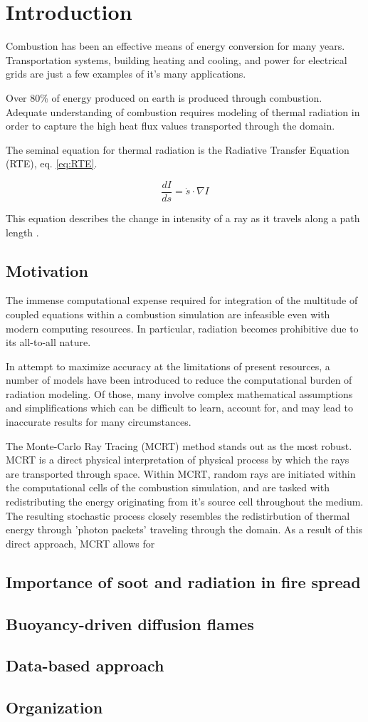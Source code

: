 \addchapheadtotoc

\chapter{Introduction}
Combustion has been an effective means of energy conversion for many years. Transportation systems, building heating and cooling, and power for electrical grids are just a few examples of it's many applications. 

Over 80\% of energy produced on earth is produced through combustion. Adequate understanding of combustion requires modeling of thermal radiation in order to capture the high heat flux values transported through the domain.

The seminal equation for thermal radiation is the Radiative Transfer Equation (RTE), eq. \ref{eq:RTE}.

\begin{equation}
    \frac{dI}{ds} = \dot{s} \cdot \nabla{I}
    \label{eq:RTE}
\end{equation}

This equation describes the change in intensity of a ray as it travels along a path length \cite{Modest2013RadiativeTransfer}.

\section{Motivation}
The immense computational expense required for integration of the multitude of coupled equations within a combustion simulation are infeasible even with modern computing resources. In particular, radiation becomes prohibitive due to its all-to-all nature. 

In attempt to maximize accuracy at the limitations of present resources, a number of models have been introduced to reduce the computational burden of radiation modeling. 
Of those, many involve complex mathematical assumptions and simplifications which can be difficult to learn, account for, and may lead to inaccurate results for many circumstances. 


The Monte-Carlo Ray Tracing (MCRT) method stands out as the most robust. 
MCRT is a direct physical interpretation of physical process by which the rays are transported through space.
Within MCRT, random rays are initiated within the computational cells of the combustion simulation, and are tasked with redistributing the energy originating from it's source cell throughout the medium. The resulting stochastic process closely resembles the redistirbution of thermal energy through 'photon packets' traveling through the domain.
As a result of this direct approach, MCRT allows for 

\section{Importance of soot and radiation in fire spread}
 

\section{Buoyancy-driven diffusion flames}
\section{Data-based approach}

\section{Organization}
